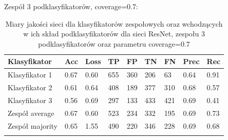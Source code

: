 \documentclass[polish,12pt]{aghthesis}
\begin{document}
\noindent Zespół 3 podklasyfikatorów, coverage=0.7:
 \begin{longtable}[h!]{|m{2.6cm}|m{1.2cm}|m{1.2cm}|m{1.2cm}|m{1.2cm}|m{1.2cm}|m{1.2cm}|m{1.2cm}|m{1.2cm}|}
 \hline
 Klasyfikator & Acc & Loss & TP & FP & TN & FN & Prec & Rec\\
 \hline
 Klasyfikator 1 & 0.67 & 0.60 & 655 & 360 & 206 & 63 & 0.64 & 0.91\\
 \hline
 Klasyfikator 2 & 0.61 & 0.64 & 408 & 189 & 377 & 310 & 0.68 & 0.57\\
 \hline
 Klasyfikator 3 & 0.56 & 0.69 & 297 & 133 & 433 & 421 & 0.69 & 0.41\\
 \hline
 Zespół average & 0.67 & 0.60 & 523 & 234 & 332 & 195 & 0.69 & 0.73\\ 
 \hline
 Zespół \newline majority & 0.65 & 1.55 & 490 & 220 & 346 & 228 & 0.69 & 0.68\\
 \hline
\caption{Miary jakości sieci dla klasyfikatorów zespołowych oraz wchodzących w ich skład podklasyfikatorów dla sieci ResNet, zespołu 3 podklasyfikatorów oraz parametru coverage=0.7}
\label{table:19}
\end{longtable}
\end{document}
